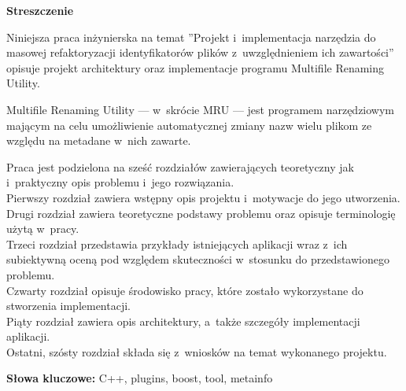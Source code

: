 \clearpage

\begin{center}
\textbf{Streszczenie}
\end{center}

\par
Niniejsza praca inżynierska na temat ''Projekt i~implementacja narzędzia do masowej refaktoryzacji identyfikatorów plików z~uwzględnieniem ich zawartości'' opisuje projekt architektury oraz implementacje programu Multifile Renaming Utility.
\par
Multifile Renaming Utility --- w~skrócie MRU --- jest programem narzędziowym mającym na celu umożliwienie automatycznej zmiany nazw wielu plikom ze względu na metadane w~nich zawarte.

\par
Praca jest podzielona na sześć rozdziałów zawierających teoretyczny jak i~praktyczny opis problemu i~jego rozwiązania.\\
Pierwszy rozdział zawiera wstępny opis projektu i~motywacje do jego utworzenia.\\
Drugi rozdział zawiera teoretyczne podstawy problemu oraz opisuje terminologię użytą w~pracy.\\
Trzeci rozdział przedstawia przykłady istniejących aplikacji wraz z~ich subiektywną oceną pod względem skuteczności w~stosunku do przedstawionego problemu.\\
Czwarty rozdział opisuje środowisko pracy, które zostało wykorzystane do stworzenia implementacji.\\
Piąty rozdział zawiera opis architektury, a~także szczegóły implementacji aplikacji.\\
Ostatni, szósty rozdział składa się z~wniosków na temat wykonanego projektu.

\vspace*{\baselineskip}

\noindent\textbf{Słowa kluczowe:} C++, plugins, boost, tool, metainfo
